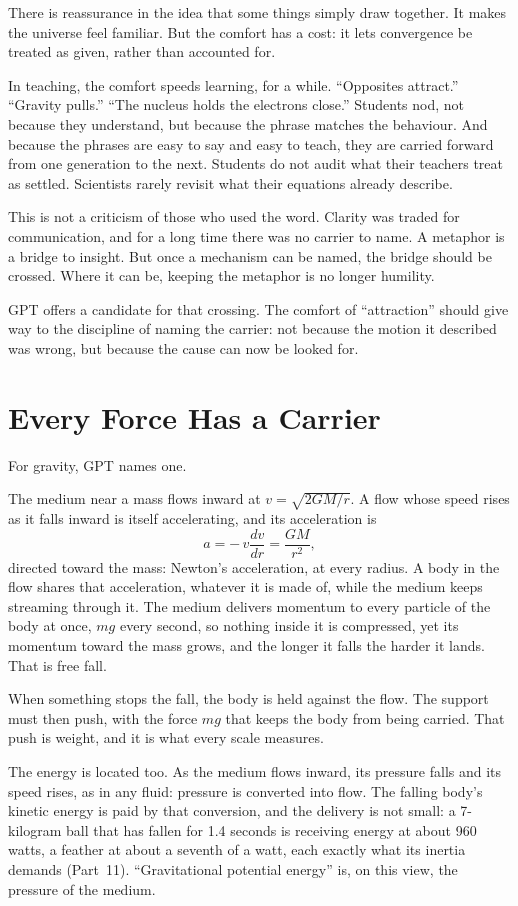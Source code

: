 \documentclass[11pt,a4paper]{article}
\begin{document}
There is reassurance in the idea that some things simply draw together. It makes the universe feel familiar. But the comfort has a cost: it lets convergence be treated as given, rather than accounted for.

In teaching, the comfort speeds learning, for a while. ``Opposites attract.'' ``Gravity pulls.'' ``The nucleus holds the electrons close.'' Students nod, not because they understand, but because the phrase matches the behaviour. And because the phrases are easy to say and easy to teach, they are carried forward from one generation to the next. Students do not audit what their teachers treat as settled. Scientists rarely revisit what their equations already describe.

This is not a criticism of those who used the word. Clarity was traded for communication, and for a long time there was no carrier to name. A metaphor is a bridge to insight. But once a mechanism can be named, the bridge should be crossed. Where it can be, keeping the metaphor is no longer humility.

GPT offers a candidate for that crossing. The comfort of ``attraction'' should give way to the discipline of naming the carrier: not because the motion it described was wrong, but because the cause can now be looked for.

\section{Every Force Has a Carrier}
\label{sec:carrier}

 For gravity, GPT names one.

\begin{hypbar}
The medium near a mass flows inward at $v=\sqrt{2GM/r}$. A flow whose speed rises as it falls inward is itself accelerating, and its acceleration is
\[
a = -\,v\frac{dv}{dr} = \frac{GM}{r^2},
\]
directed toward the mass: Newton's acceleration, at every radius. A body in the flow shares that acceleration, whatever it is made of, while the medium keeps streaming through it. The medium delivers momentum to every particle of the body at once, $mg$ every second, so nothing inside it is compressed, yet its momentum toward the mass grows, and the longer it falls the harder it lands. That is free fall.

When something stops the fall, the body is held against the flow. The support must then push, with the force $mg$ that keeps the body from being carried. That push is weight, and it is what every scale measures.

The energy is located too. As the medium flows inward, its pressure falls and its speed rises, as in any fluid: pressure is converted into flow. The falling body's kinetic energy is paid by that conversion, and the delivery is not small: a 7-kilogram ball that has fallen for 1.4 seconds is receiving energy at about 960 watts, a feather at about a seventh of a watt, each exactly what its inertia demands (Part~11). ``Gravitational potential energy'' is, on this view, the pressure of the medium.
\end{hypbar}
\end{document}
